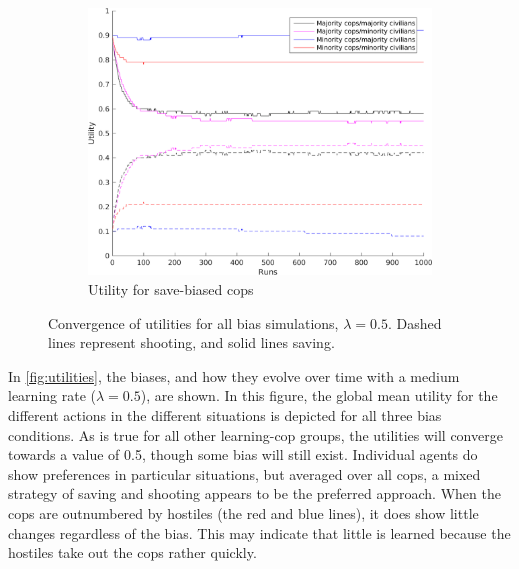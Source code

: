 \begin{figure}[H]
    \begin{subfigure}[b]{0.62\textwidth}
        \includegraphics[width=\textwidth]{./pictures/Utility05BiasSave}
        \caption{Utility for save-biased cops }
        \label{fig:utSave}
    \end{subfigure}
\caption{Convergence of utilities for all bias simulations, $\lambda = 0.5$. Dashed lines represent shooting, and solid lines saving. }
\label{fig:utilities}
\end{figure}
In \autoref{fig:utilities}, the biases, and how they evolve over time with a medium learning rate ($\lambda = 0.5$), are shown. In this figure, the global mean utility for the different actions in the different situations is depicted for all three bias conditions. As is true for all other learning-cop groups, the utilities will converge towards a value of 0.5, though some bias will still exist. Individual agents do show preferences in particular situations, but averaged over all cops, a mixed strategy of saving and shooting appears to be the preferred approach. When the cops are outnumbered by hostiles (the red and blue lines), it does show little changes regardless of the bias. This may indicate that little is learned because the hostiles take out the cops rather quickly. 



